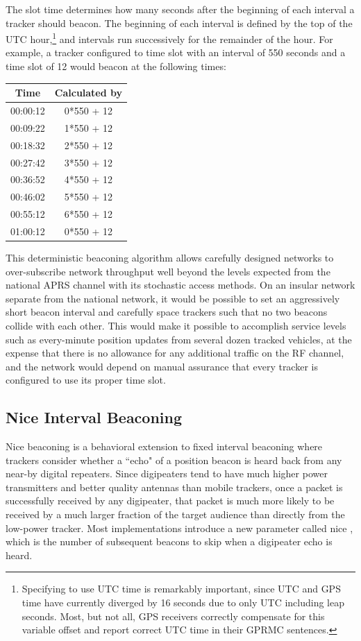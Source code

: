 The slot time determines how many seconds after the beginning of each interval
a tracker should beacon. The beginning of each interval is defined by the top of
the UTC hour,\footnote{Specifying to use UTC time is remarkably 
	important, since UTC and GPS time have currently diverged by 16 seconds due to
	only UTC including leap seconds. Most, but not all, GPS receivers correctly
	compensate for this variable offset and report correct UTC time in their
GPRMC sentences.} and intervals run successively for the remainder of the hour.
For example, a tracker configured to time slot with an interval of 550 seconds and
a time slot of 12 would beacon at the following times:
\begin{tabular}{|c|c|}
	\hline
	Time & Calculated by \\ \hline
	00:00:12 & 0*550 + 12 \\ \hline
	00:09:22 & 1*550 + 12 \\ \hline
	00:18:32 & 2*550 + 12 \\ \hline
	00:27:42 & 3*550 + 12 \\ \hline
	00:36:52 & 4*550 + 12 \\ \hline
	00:46:02 & 5*550 + 12 \\ \hline
	00:55:12 & 6*550 + 12 \\ \hline
	01:00:12 & 0*550 + 12 \\ \hline
\end{tabular}

This deterministic beaconing algorithm allows carefully designed networks to 
over-subscribe network throughput well beyond the levels expected from 
the national APRS channel with its stochastic access methods. 
On an insular network separate from the national
network, it would be possible to set an aggressively short beacon interval and 
carefully space trackers such that no two beacons collide with each other. 
This would make it possible to accomplish service levels such as
every-minute position updates from several dozen tracked vehicles, 
at the expense that there is no allowance for any additional traffic 
on the RF channel, and the network would depend on manual 
assurance that every tracker is configured to use its proper time slot.

\subsection{Nice Interval Beaconing}

Nice beaconing is a behavioral extension to fixed interval beaconing 
where trackers consider whether a ``echo"
of a position beacon is heard back from any near-by digital repeaters.
Since digipeaters tend to have much higher power transmitters and better quality
antennas than mobile trackers, once a packet is successfully received by any 
digipeater, that packet is much more likely to be received by a much larger
fraction of the target audience than directly from the low-power tracker. 
Most implementations introduce a new parameter
called nice \cite[p.~38]{ot3manual}, 
which is the number of subsequent beacons to skip when a digipeater echo is heard.

